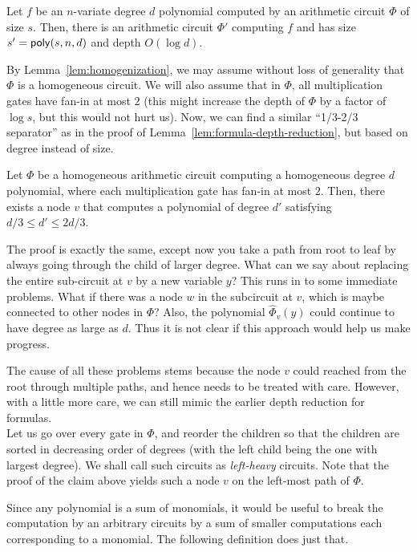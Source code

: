 \begin{theorem}
Let $f$ be an $n$-variate degree $d$ polynomial computed by an arithmetic circuit $\Phi$ of size $s$. Then, there is an arithmetic circuit $\Phi'$ computing $f$ and has size $s' = \mathsf{poly}(s,n,d)$ and depth $O(\log d)$. 
\end{theorem}

By Lemma~\ref{lem:homogenization}, we may assume without loss of generality that $\Phi$ is a homogeneous circuit. We will also assume that in $\Phi$, all multiplication gates have fan-in at most $2$ (this might increase the depth of $\Phi$ by a factor of $\log s$, but this would not hurt us). Now, we can find a similar ``1/3-2/3 separator'' as in the proof of Lemma~\ref{lem:formula-depth-reduction}, but based on degree instead of size. 

\begin{claim}
Let $\Phi$ be a homogeneous arithmetic circuit computing a homogeneous degree $d$ polynomial, where each multiplication gate has fan-in at most $2$. Then, there exists a node $v$ that computes a polynomial of degree $d'$ satisfying $d/3 \leq d' \leq 2d/3$. 
\end{claim}

The proof is exactly the same, except now you take a path from root to leaf by always going through the child of larger degree. What can we say about replacing the entire sub-circuit at $v$ by a new variable $y$? This runs in to some immediate problems. What if there was a node $w$ in the subcircuit at $v$, which is maybe connected to other nodes in $\Phi$? Also, the polynomial $\hat{\Phi}_v(y)$ could continue to have degree as large as $d$. Thus it is not clear if this approach would help us make progress. 

The cause of all these problems stems because the node $v$ could reached from the root through multiple paths, and hence needs to be treated with care. However, with a little more care, we can still mimic the earlier depth reduction for formulas. \\

Let us go over every gate in $\Phi$, and reorder the children so that the children are sorted in decreasing order of degrees (with the left child being the one with largest degree). We shall call such circuits as \emph{left-heavy} circuits. Note that the proof of the claim above yields such a node $v$ on the left-most path of $\Phi$. 

Since any polynomial is a sum of monomials, it would be useful to break the computation by an arbitrary circuits by a sum of smaller computations each corresponding to a monomial. The following definition does just that. 

